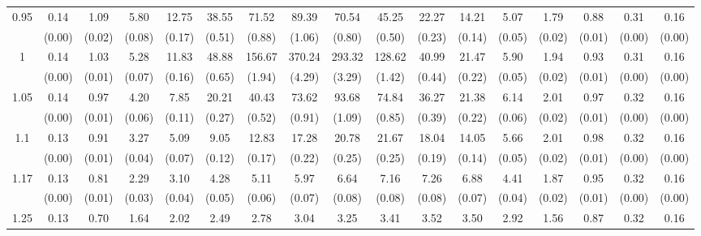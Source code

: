 \documentclass[12pt]{article}  %
\theoremstyle{plain}
\begin{document}
\begin{sidewaystable}[htbp]
\begin{tabular}{ccccccccccccccccc}
\multirow{2}{*}{0.95}  &0.14& 1.09& 5.80& 12.75& 38.55 & 71.52 & 89.39 & 70.54 & 45.25 &22.27& 14.21 & 5.07 & 1.79 & 0.88 & 0.31 & 0.16\\                
					  & (0.00)& (0.02)& (0.08)& (0.17)& (0.51)& (0.88)& (1.06)& (0.80)& (0.50)&  (0.23)&  (0.14)&  (0.05)&  (0.02)& (0.01)& (0.00)& (0.00)\\ \hline
\multirow{2}{*}{1}  &  0.14 &1.03& 5.28 &11.83 &48.88 &156.67& 370.24& 293.32 &128.62& 40.99 &21.47 & 5.90 & 1.94 & 0.93 & 0.31 & 0.16\\
                      & (0.00)& (0.01)& (0.07)& (0.16)& (0.65)& (1.94)& (4.29)& (3.29)& (1.42)&  (0.44)&  (0.22)&  (0.05)&  (0.02) & (0.01)& (0.00)& (0.00)\\ \hline                                                                     
\multirow{2}{*}{1.05}  & 0.14 &0.97& 4.20 & 7.85& 20.21 & 40.43 & 73.62 & 93.68 & 74.84& 36.27& 21.38 & 6.14 & 2.01 & 0.97 & 0.32 & 0.16\\
                      & (0.00)&   (0.01)& (0.06)& (0.11)& (0.27)& (0.52)& (0.91)& (1.09)& (0.85)&  (0.39)&  (0.22)&  (0.06)&  (0.02)& (0.01)& (0.00)& (0.00)\\ \hline                                                                                                                                          
\multirow{2}{*}{1.1}  &0.13& 0.91& 3.27 & 5.09 & 9.05 & 12.83 & 17.28 & 20.78 & 21.67& 18.04 &14.05 & 5.66 & 2.01 & 0.98 & 0.32 & 0.16\\
                      &  (0.00)&   (0.01)& (0.04)& (0.07)& (0.12)& (0.17)& (0.22)& (0.25)& (0.25)&  (0.19)&  (0.14)&  (0.05)&  (0.02)& (0.01)& (0.00)& (0.00)\\ \hline
\multirow{2}{*}{1.17}  & 0.13 &0.81& 2.29 & 3.10 & 4.28 &  5.11  & 5.97 &  6.64  & 7.16 & 7.26 & 6.88 & 4.41 & 1.87 & 0.95 & 0.32 & 0.16\\
                      & (0.00)&   (0.01)& (0.03)& (0.04)& (0.05)& (0.06)& (0.07)& (0.08)& (0.08)&  (0.08)&  (0.07)&  (0.04)&  (0.02)& (0.01)& (0.00)& (0.00)\\ \hline                                                                                                                                                                                                                                                                                    
                                                                     \multirow{2}{*}{1.25}  &0.13 &0.70 &1.64 & 2.02 & 2.49 &  2.78  & 3.04 &  3.25  & 3.41 & 3.52 & 3.50 & 2.92 & 1.56 & 0.87 & 0.32 & 0.16\\

\end{tabular}
\end{sidewaystable}
\end{document}
